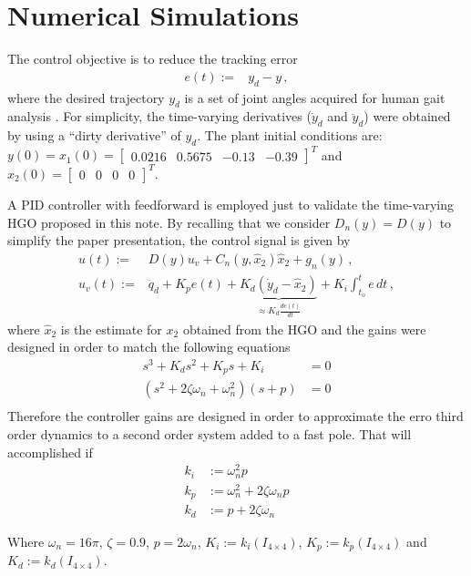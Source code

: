 \documentclass[letterpaper, 10 pt, conference]{ieeeconf}  %
\theoremstyle{plain}
\theoremstyle{definition}
\theoremstyle{remark}
\begin{document}
\section{Numerical Simulations}

The control objective is to reduce the tracking error 
%
\begin{align}
e(t) := & y_{d} - y\,,
\end{align}
%
where the desired trajectory $y_d$ is a set of joint angles acquired for human gait analysis \cite{Schwartz2008}.
%
For simplicity, the time-varying derivatives ($\dot{y}_d$ and $\ddot{y}_d$) were obtained by using a ``dirty derivative'' of $y_d$. The plant initial conditions are: $y(0)=x_1(0)=\left[\begin{array}{cccc} 0.0216  & 0.5675 & -0.13 & -0.39\end{array} \right ]^T$ and $x_2(0)=\left[\begin{array}{cccc} 0  & 0 & 0 & 0\end{array} \right ]^T$.


A  PID controller with feedforward is employed just to validate the time-varying HGO proposed in this note. By recalling that we  consider $D_n(y)=D(y)$ to simplify the paper presentation, the control  signal is given by
%
\begin{align}
u(t) := & D(y) u_v + C_{n}(y,\hat{x}_2) \hat{x}_2+g_{n}(y)\,, \\
u_v(t):= &\ddot{q}_d + K_p e(t) + \underbrace{K_d (\dot{y}_d - \hat{x}_2)}_{\approx K_d \frac{de(t)}{dt}} + K_i\int_{t_o}^{t}e \, dt\,,
\label{eq:defu}
\end{align}
%
where $\hat{x}_2$ is the estimate for $x_2$ obtained from the HGO and the gains were designed in order to match the following equations
%
\begin{align}
	s^3 + K_ds^2 + K_ps + K_i &= 0 \\
	(s^2 + 2\zeta \omega_n + \omega_n^2)(s + p) &= 0 \\
\end{align}
%
Therefore the controller gains are designed in order to approximate the erro third order dynamics to a second order system added to a fast pole. That will accomplished if
\begin{align}
	k_i &:= \omega_n^2p \\
	k_p &:= \omega_n^2 + 2\zeta \omega_np \\
	k_d &:= p + 2\zeta \omega_n 
\end{align}

Where $\omega_n = 16\pi$, $\zeta = 0.9$, $p = 2\omega_n$, $K_i := k_i(I_{4 \times 4})$, $K_p := k_p(I_{4 \times 4})$ and $K_d := k_d(I_{4 \times 4})$.
\end{document}
